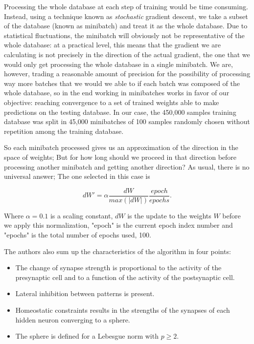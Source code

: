 \documentclass[a4paper]{report}
\begin{document}
Processing the whole database at each step of training would be time consuming. Instead, using a technique known as \textit{stochastic} gradient descent, we take a subset of the database  (known as minibatch) and treat it as the whole database. Due to statistical fluctuations, the minibatch will obviously not be representative of the whole database: at a practical level, this means that the gradient we are calculating is not precisely in the direction of the actual gradient, the one that we would only get processing the whole database in a single minibatch.
We are, however, trading a reasonable amount of precision for the possibility of processing way more batches that we would we able to if each batch was composed of the whole database, so in the end working in minibatches works in favor of our objective: reaching convergence to a set of trained weights able to make predictions on the testing database.
In our case, the 450,000 samples training database was split in 45,000 minibatches of 100 samples randomly chosen without repetition among the training database.

So each minibatch processed gives us an approximation of the direction in the space of weights; But for how long should we proceed in that direction before processing another minibatch and getting another direction?
As usual, there is no universal answer; The one selected in this case is

\begin{equation}
	dW'=\alpha \frac{dW}{max(|dW|)}\frac{epoch}{epochs}.
	\label{learnrate}
\end{equation}

Where $\alpha=0.1$ is a scaling constant, $dW$ is the update to the weights $W$ before we apply this normalization, "epoch" is the current epoch index number and "epochs" is the total number of epochs used, 100.

The authors also sum up the characteristics of the algorithm  in four points:
\begin{itemize}
	\item The change of synapse strength is proportional to the activity of the presynaptic cell and to a function of the activity of the postsynaptic cell.
	\item Lateral inhibition between patterns is present.
	\item Homeostatic constraints results in the strengths of the synapses of each hidden neuron converging to a sphere.
	\item The sphere is defined for a Lebesgue norm with $p \geq 2$.
\end{itemize}
\end{document}
